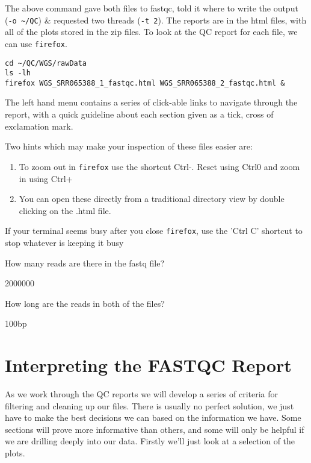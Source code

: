 \begin{steps}
The above command gave both files to fastqc, told it where to write the output (\texttt{-o \~{}/QC}) \& requested two threads (\texttt{-t 2}).
The reports are in the html files, with all of the plots stored in the zip files.
To look at the QC report for each file, we can use \texttt{firefox}.
\begin{lstlisting}
cd ~/QC/WGS/rawData
ls -lh
firefox WGS_SRR065388_1_fastqc.html WGS_SRR065388_2_fastqc.html &
\end{lstlisting}
The left hand menu contains a series of click-able links to navigate through the report, with a quick guideline about each section given as a tick, cross of exclamation mark.
\end{steps}

\begin{note}
Two hints which may make your inspection of these files easier are:
\begin{enumerate}
	\item To zoom out in \texttt{firefox} use the shortcut Ctrl-. Reset using Ctrl0 and zoom in using Ctrl+
	\item You can open these directly from a traditional directory view by double clicking on the .html file.
\end{enumerate}
If your terminal seems busy after you close \texttt{firefox}, use the 'Ctrl C' shortcut to stop whatever is keeping it busy
\end{note}

\begin{questions}
How many reads are there in the fastq file?\\
\begin{answer}
  2000000 \\
\end{answer}
How long are the reads in both of the files?\\
\begin{answer}
  100bp \\
\end{answer}
\end{questions}

\section{Interpreting the FASTQC Report}
\begin{note}
As we work through the QC reports we will develop a series of criteria for filtering and cleaning up our files.
There is usually no perfect solution, we just have to make the best decisions we can based on the information we have.
Some sections will prove more informative than others, and some will only be helpful if we are drilling deeply into our data.
Firstly we'll just look at a selection of the plots.
\end{note}

